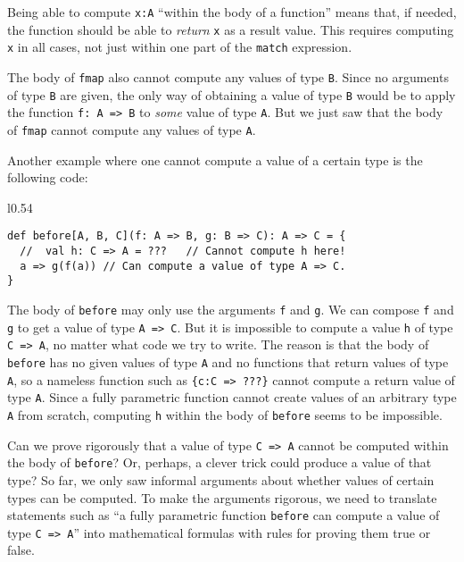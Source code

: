 Being able to compute \lstinline!x:A! \textsf{``}within the body of a function\textsf{''}
means that, if needed, the function should be able to \emph{return}
\lstinline!x! as a result value. This requires computing \lstinline!x!
in all cases, not just within one part of the \lstinline!match! expression. 

The body of \lstinline!fmap! also cannot compute any values of type
\lstinline!B!. Since no arguments of type \lstinline!B! are given,
the only way of obtaining a value of type \lstinline!B! would be
to apply the function \lstinline!f: A => B! to \emph{some} value
of type \lstinline!A!. But we just saw that the body of \lstinline!fmap!
cannot compute any values of type \lstinline!A!.

Another example where one cannot compute a value of a certain type
is the following code:

\begin{wrapfigure}{l}{0.54\columnwidth}%
\vspace{-0.1\baselineskip}
\begin{lstlisting}
def before[A, B, C](f: A => B, g: B => C): A => C = {
  //  val h: C => A = ???   // Cannot compute h here!
  a => g(f(a)) // Can compute a value of type A => C.
}
\end{lstlisting}

\vspace{-1.2\baselineskip}
\end{wrapfigure}%

\noindent The body of \lstinline!before! may only use the arguments
\lstinline!f! and \lstinline!g!. We can compose \lstinline!f! and
\lstinline!g! to get a value of type \lstinline!A => C!. But it
is impossible to compute a value \lstinline!h! of type \lstinline!C => A!,
no matter what code we try to write. The reason is that the body of
\lstinline!before! has no given values of type \lstinline!A! and
no functions that return values of type \lstinline!A!, so a nameless
function such as \lstinline!{c:C => ???}! cannot compute a return
value of type \lstinline!A!. Since a fully parametric function cannot
create values of an arbitrary type \lstinline!A! from scratch, computing
\lstinline!h! within the body of \lstinline!before! seems to be
impossible.

Can we prove rigorously that a value of type \lstinline!C => A! cannot
be computed within the body of \lstinline!before!? Or, perhaps, a
clever trick could produce a value of that type? So far, we only saw
informal arguments about whether values of certain types can be computed.
To make the arguments rigorous, we need to translate statements such
as \textsf{``}a fully parametric function \lstinline!before! can compute
a value of type \lstinline!C => A!\textsf{''} into mathematical formulas
with rules for proving them true or false.

